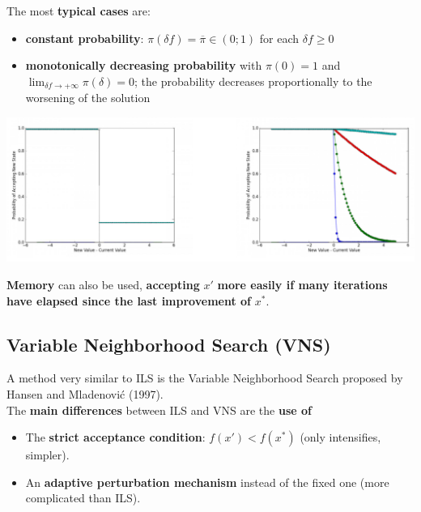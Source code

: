 The most \textbf{typical cases} are:
\begin{itemize}
	\item \textbf{constant probability}: $\pi (\delta f ) = \overline{\pi} \in (0; 1)$ for each $\delta f \geq 0$
	
	\item \textbf{monotonically decreasing probability} with $\pi (0) = 1$ and $\lim_{\delta f \rightarrow + \infty} \pi (\delta) = 0$; the probability decreases proportionally to the worsening of the solution
\end{itemize}

\begin{center}
	\includegraphics[width=\columnwidth]{img/accept1}
\end{center}

\textbf{Memory} can also be used, \textbf{accepting} $x'$ \textbf{more easily if many iterations have elapsed since the last improvement of} $x^\ast$.\\

\newpage

\subsection{Variable Neighborhood Search (VNS)}

A method very similar to ILS is the Variable Neighborhood Search proposed by Hansen and Mladenovi\'c (1997).\\

The \textbf{main differences} between ILS and VNS are the \textbf{use of}
\begin{itemize}
	\item The \textbf{strict acceptance condition}: $f (x') < f (x^\ast)$ (only intensifies, simpler).\\
	
	\item An \textbf{adaptive perturbation mechanism} instead of the fixed one (more complicated than ILS).\\
\end{itemize}

